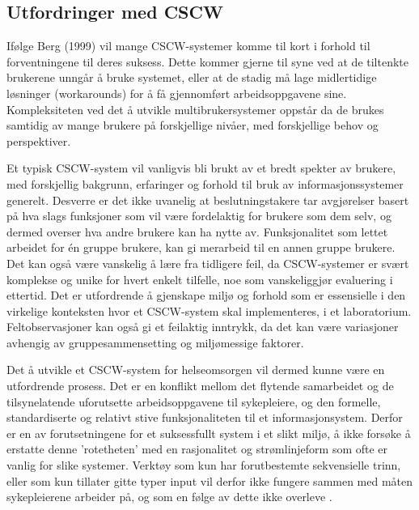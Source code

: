 \subsection{Utfordringer med CSCW}
\label{chp:utfordringerMedCSCW}

Ifølge Berg (1999) vil mange CSCW-systemer komme til kort i forhold til forventningene til deres suksess. Dette kommer gjerne til syne ved at de tiltenkte brukerene unngår å bruke systemet, eller at de stadig må lage midlertidige løsninger (workarounds) for å få gjennomført arbeidsoppgavene sine. 
Kompleksiteten ved det å utvikle multibrukersystemer oppstår da de brukes samtidig av mange brukere på forskjellige nivåer, med forskjellige behov og perspektiver.

\noindent 
Et typisk CSCW-system vil vanligvis bli brukt av et bredt spekter av brukere, med forskjellig bakgrunn, erfaringer og forhold til bruk av informasjonssystemer generelt. Desverre er det ikke uvanelig at beslutningstakere tar avgjørelser basert på hva slags funksjoner som vil være fordelaktig for brukere som dem selv, og dermed overser hva andre brukere kan ha nytte av. Funksjonalitet som lettet arbeidet for én gruppe brukere, kan gi merarbeid til en annen gruppe brukere. Det kan også være vanskelig å lære fra tidligere feil, da CSCW-systemer er svært komplekse og unike for hvert enkelt tilfelle, noe som vanskeliggjør evaluering i ettertid. Det er utfordrende å gjenskape miljø og forhold som er essensielle i den virkelige konteksten hvor et CSCW-system skal implementeres, i et laboratorium. Feltobservasjoner kan også gi et feilaktig inntrykk, da det kan være variasjoner avhengig av gruppesammensetting og miljømessige faktorer.

\noindent
Det å utvikle et CSCW-system for helseomsorgen vil dermed kunne være en utfordrende prosess. Det er en konflikt mellom det flytende samarbeidet og de tilsynelatende uforutsette arbeidsoppgavene til sykepleiere, og den formelle, standardiserte og relativt stive funksjonaliteten til et informasjonsystem. Derfor er en av forutsetningene for et suksessfullt system i et slikt miljø, å ikke forsøke å erstatte denne 'rotetheten' med en rasjonalitet og strømlinjeform som ofte er vanlig for slike systemer. Verktøy som kun har forutbestemte sekvensielle trinn, eller som kun tillater gitte typer input vil derfor ikke fungere sammen med måten sykepleierene arbeider på, og som en følge av dette ikke overleve \cite{Berg99}.